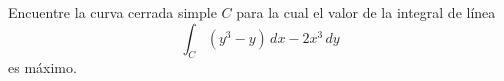 \item Encuentre la curva cerrada simple $C$ para la cual el valor de la integral de línea
    \[ \int_C (y^3 - y) \, dx - 2x^3 \, dy \]
    es máximo.
